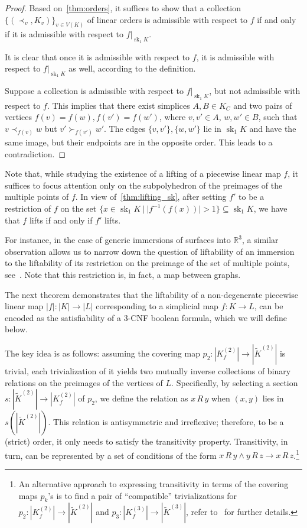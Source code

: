 \documentclass[a4paper,12pt,reqno,oneside]{amsart}
\theoremstyle{plain}
\theoremstyle{definition}
\theoremstyle{plain}
\newcommand{\from}{\colon}
\newcommand{\wt}[1]{\widetilde{#1}}
\newcommand{\R}{\mathbb{R}}
\DeclareMathOperator{\sk}{sk}
\begin{document}
\begin{proof}
  Based on~\cref{thm:orders}, it suffices to show that a collection
  ${\{(\prec_v, K_v)\}_{v \in V(K)}}$ of linear orders is admissible with respect to $f$ if and only
  if it is admissible with respect to $f \big|_{\sk_1 K}$.

  It is clear that once it is admissible with respect to $f$, it is admissible with respect to $f
  \big|_{\sk_1 K}$ as well, according to the definition.

  Suppose a collection is admissible with respect to $f \big|_{\sk_1 K}$, but not admissible with respect to
  $f$. This implies that there exist simplices $A, B \in K_C$ and two pairs of vertices
  $f(v) = f(w), f(v') = f(w')$, where $v, v' \in A$, $w, w' \in B$, such that $v \prec_{f(v)} w$ but
  $v' \succ_{f(v')} w'$. The edges $\{v, v'\}, \{w, w'\}$ lie in $\sk_1 K$ and have the same image, but their
  endpoints are in the opposite order. This leads to a contradiction.
\end{proof}

Note that, while studying the existence of a lifting of a piecewise linear map $f$, it suffices to
focus attention only on the subpolyhedron of the preimages of the multiple points of $f$. In view
of~\cref{thm:lifting_sk}, after setting $f'$ to be a restriction of $f$ on the set
$\{ x \in \sk_1 K\ |\ |f^{-1}(f(x))| > 1 \} \subseteq \sk_{1} K$, we have that $f$ lifts if and only
if $f'$ lifts.

For instance, in the case of generic immersions of surfaces into $\R^{3}$, a similar observation
allows us to narrow down the question of liftability of an immersion to the liftability of its
restriction on the preimage of the set of multiple points, see~\cite[Theorem
3.2]{carter_saito_paper}. Note that this restriction is, in fact, a map between graphs.

The next theorem demonstrates that the liftability of a non-degenerate piecewise linear map
$|f| \from |K| \to |L|$ corresponding to a simplicial map $f \from K \to L$, can be encoded as the
satisfiability of a 3-CNF boolean formula, which we will define below.

The key idea is as follows: assuming the covering map $p_2 \from |K^{(2)}_f| \to |\wt{K}^{(2)}|$ is
trivial, each trivialization of it yields two mutually inverse collections of binary relations on
the preimages of the vertices of $L$. Specifically, by selecting a section
$s \from |\wt{K}^{(2)}| \to |K^{(2)}_f|$ of $p_2$, we define the relation as $x\,R\,y$ when $(x, y)$
lies in $s(|\wt{K}^{(2)}|)$. This relation is antisymmetric and irreflexive; therefore, to be a
(strict) order, it only needs to satisfy the transitivity property. Transitivity, in turn, can be
represented by a set of conditions of the form $x\,R\,y \land y\,R\,z \to x\,R\,z$.\footnote{An
  alternative approach to expressing transitivity in terms of the covering maps $p_{k}$'s is to
  find a pair of ``compatible'' trivializations for $p_2 \from |K^{(2)}_f| \to |\wt{K}^{(2)}|$ and
  $p_3 \from |K^{(3)}_f| \to |\wt{K}^{(3)}|$, refer to~\cite[Theorem 5]{mel2} for further details.}
\end{document}
